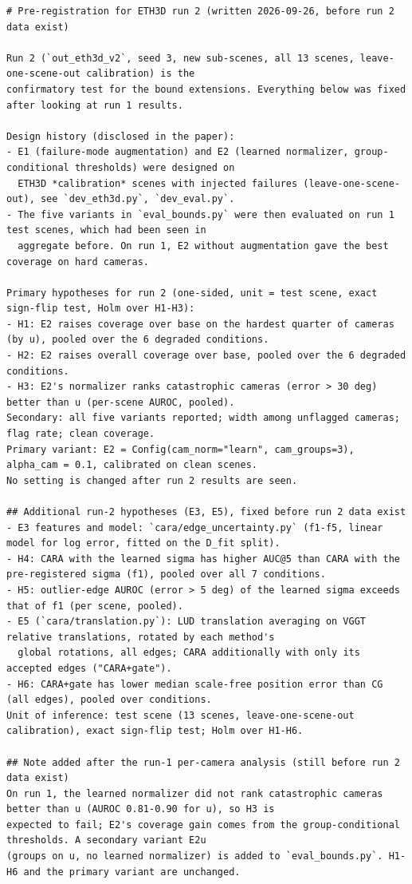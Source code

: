 \documentclass[preprint,12pt]{elsarticle}
\begin{document}
{\footnotesize
\begin{Verbatim}[breaklines=true]
# Pre-registration for ETH3D run 2 (written 2026-09-26, before run 2 data exist)

Run 2 (`out_eth3d_v2`, seed 3, new sub-scenes, all 13 scenes, leave-one-scene-out calibration) is the
confirmatory test for the bound extensions. Everything below was fixed after looking at run 1 results.

Design history (disclosed in the paper):
- E1 (failure-mode augmentation) and E2 (learned normalizer, group-conditional thresholds) were designed on
  ETH3D *calibration* scenes with injected failures (leave-one-scene-out), see `dev_eth3d.py`, `dev_eval.py`.
- The five variants in `eval_bounds.py` were then evaluated on run 1 test scenes, which had been seen in
  aggregate before. On run 1, E2 without augmentation gave the best coverage on hard cameras.

Primary hypotheses for run 2 (one-sided, unit = test scene, exact sign-flip test, Holm over H1-H3):
- H1: E2 raises coverage over base on the hardest quarter of cameras (by u), pooled over the 6 degraded conditions.
- H2: E2 raises overall coverage over base, pooled over the 6 degraded conditions.
- H3: E2's normalizer ranks catastrophic cameras (error > 30 deg) better than u (per-scene AUROC, pooled).
Secondary: all five variants reported; width among unflagged cameras; flag rate; clean coverage.
Primary variant: E2 = Config(cam_norm="learn", cam_groups=3), alpha_cam = 0.1, calibrated on clean scenes.
No setting is changed after run 2 results are seen.

## Additional run-2 hypotheses (E3, E5), fixed before run 2 data exist
- E3 features and model: `cara/edge_uncertainty.py` (f1-f5, linear model for log error, fitted on the D_fit split).
- H4: CARA with the learned sigma has higher AUC@5 than CARA with the pre-registered sigma (f1), pooled over all 7 conditions.
- H5: outlier-edge AUROC (error > 5 deg) of the learned sigma exceeds that of f1 (per scene, pooled).
- E5 (`cara/translation.py`): LUD translation averaging on VGGT relative translations, rotated by each method's
  global rotations, all edges; CARA additionally with only its accepted edges ("CARA+gate").
- H6: CARA+gate has lower median scale-free position error than CG (all edges), pooled over conditions.
Unit of inference: test scene (13 scenes, leave-one-scene-out calibration), exact sign-flip test; Holm over H1-H6.

## Note added after the run-1 per-camera analysis (still before run 2 data exist)
On run 1, the learned normalizer did not rank catastrophic cameras better than u (AUROC 0.81-0.90 for u), so H3 is
expected to fail; E2's coverage gain comes from the group-conditional thresholds. A secondary variant E2u
(groups on u, no learned normalizer) is added to `eval_bounds.py`. H1-H6 and the primary variant are unchanged.

\end{Verbatim}
}



\end{document}
